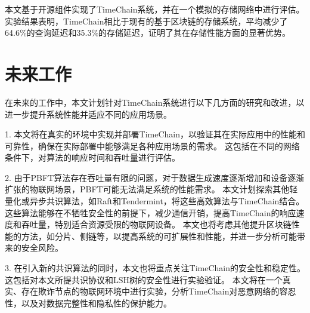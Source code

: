本文基于开源组件实现了TimeChain系统，并在一个模拟的存储网络中进行评估。
实验结果表明，TimeChain相比于现有的基于区块链的存储系统，平均减少了64.6\%的查询延迟和35.3\%的存储延迟，证明了其在存储性能方面的显著优势。

\section{未来工作}
在未来的工作中，本文计划针对TimeChain系统进行以下几方面的研究和改进，以进一步提升系统性能并适应不同的应用场景。

1. 本文将在真实的环境中实现并部署TimeChain，以验证其在实际应用中的性能和可靠性，确保在实际部署中能够满足各种应用场景的需求。
这包括在不同的网络条件下，对算法的响应时间和吞吐量进行评估。

2. 由于PBFT算法存在吞吐量有限的问题，对于数据生成速度逐渐增加和设备逐渐扩张的物联网场景，PBFT可能无法满足系统的性能需求。
本文计划探索其他轻量化或异步共识算法，如Raft和Tendermint，将这些高效算法与TimeChain结合。
这些算法能够在不牺牲安全性的前提下，减少通信开销，提高TimeChain的响应速度和吞吐量，特别适合资源受限的物联网设备。
本文也将考虑其他提升区块链性能的方法，如分片、侧链等，以提高系统的可扩展性和性能，并进一步分析可能带来的安全风险。

3. 在引入新的共识算法的同时，本文也将重点关注TimeChain的安全性和稳定性。
这包括对本文所提共识协议和LSH树的安全性进行实验验证。
本文将在一个真实、存在欺诈节点的物联网环境中进行实验，分析TimeChain对恶意网络的容忍性，以及对数据完整性和隐私性的保护能力。
